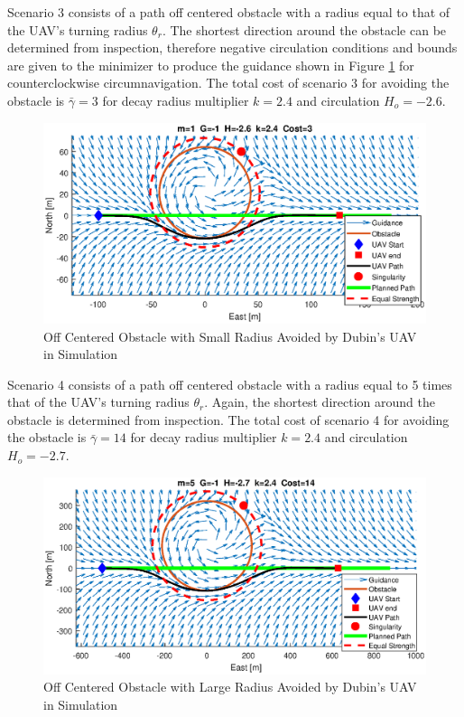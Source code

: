 \documentclass[numbered,pdftex]{ohio-etd}
\begin{document}
Scenario 3 consists of a path off centered obstacle with a radius equal to that of the UAV's turning radius $\theta_r$. The shortest direction around the obstacle can be determined from inspection, therefore negative circulation conditions and bounds are given to the minimizer to produce the guidance shown in Figure \ref{fig:m1y05} for counterclockwise circumnavigation. The total cost of scenario 3 for avoiding the obstacle is $\bar{\gamma}=3$ for decay radius multiplier $k=2.4$ and circulation $H_o = -2.6$.



\begin{figure}[H]
	\centering
	\includegraphics[trim = 0 85 0 85, clip, width=16cm]{Figures/results/m1Y05}
	\caption{Off Centered Obstacle with Small Radius Avoided by Dubin's UAV in Simulation}
	\label{fig:m1y05}
\end{figure}

Scenario 4 consists of a path off centered obstacle with a radius equal to 5 times that of the UAV's turning radius $\theta_r$. Again, the shortest direction around the obstacle is determined from inspection. The total cost of scenario 4 for avoiding the obstacle is $\bar{\gamma}=14$ for decay radius multiplier $k=2.4$ and circulation $H_o = -2.7$.


\begin{figure}[H]
	\centering
	\includegraphics[trim = 0 85 0 85, clip, width=16cm]{Figures/results/m5Y05}
	\caption{Off Centered Obstacle with Large Radius Avoided by Dubin's UAV in Simulation}
	\label{fig:m5y05}
\end{figure}
\end{document}
